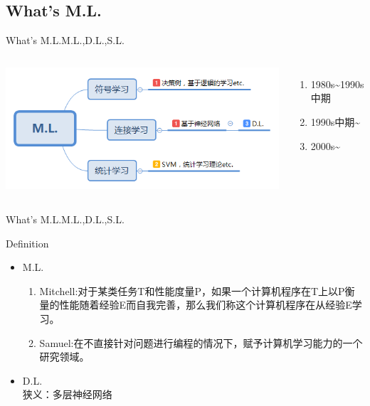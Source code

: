 \documentclass{beamer}
\begin{document}
\subsection{What\rq{}s M.L.}
\begin{frame}{What\rq{}s M.L.}{\quad\quad\quad M.L.,D.L.,S.L.}


\begin{columns}


\includegraphics[scale=0.4]{fig/ML.png}



  \begin{enumerate}
  \item 1980s\textasciitilde 1990s 中期 
  \item 1990s中期\textasciitilde
  \item 2000s\textasciitilde
  \end{enumerate}
\end{columns}
\end{frame}

\begin{frame}{What\rq{}s M.L.}{\quad\quad\quad M.L.,D.L.,S.L.}
  \begin{block}{Definition}
   \begin{itemize}
  \item M.L.
	\begin{enumerate}
	\item Mitchell:对于某类任务T和性能度量P，如果一个计算机程序在T上以P衡量的性能随着经验E而自我完善，那么我们称这个计算机程序在从经验E学习。
	\item Samuel:在不直接针对问题进行编程的情况下，赋予计算机学习能力的一个研究领域。
	\end{enumerate}
  \item D.L.\\狭义：多层神经网络
  \end{itemize}
  \end{block}
\end{frame}
\end{document}
